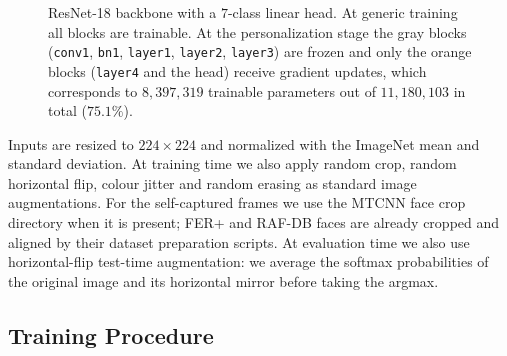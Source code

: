 \begin{figure}[H]
  \centering
  \caption{ResNet-18 backbone with a $7$-class linear head. At generic training all blocks are trainable. At the personalization stage the gray blocks (\texttt{conv1}, \texttt{bn1}, \texttt{layer1}, \texttt{layer2}, \texttt{layer3}) are frozen and only the orange blocks (\texttt{layer4} and the head) receive gradient updates, which corresponds to $8{,}397{,}319$ trainable parameters out of $11{,}180{,}103$ in total ($75.1\%$).}
  \label{fig:arch}
\end{figure}

Inputs are resized to $224\times 224$ and normalized with the ImageNet mean and standard deviation. At training time we also apply random crop, random horizontal flip, colour jitter and random erasing as standard image augmentations. For the self-captured frames we use the MTCNN face crop directory when it is present; FER+ and RAF-DB faces are already cropped and aligned by their dataset preparation scripts. At evaluation time we also use horizontal-flip test-time augmentation: we average the softmax probabilities of the original image and its horizontal mirror before taking the argmax.

\subsection{Training Procedure}
\label{sec:impl:training}

